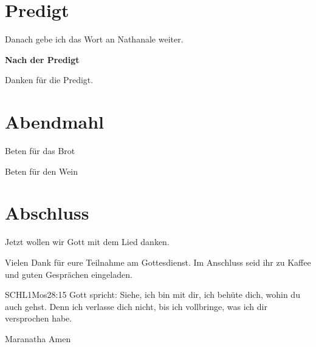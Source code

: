 \begin{spacing}{1.5}

\end{spacing}


\section{Predigt}

Danach gebe ich das Wort an Nathanale weiter.

\textbf{Nach der Predigt}

Danken für die Predigt.

\section{Abendmahl}

Beten für das Brot


Beten für den Wein


\section{Abschluss}

Jetzt wollen wir Gott mit dem Lied  danken.

Vielen Dank für eure Teilnahme am Gottesdienst. Im Anschluss seid ihr zu Kaffee und guten Gesprächen eingeladen.
\beten{}

\begin{bibelbox}{SCHL}{1Mos}{28:15}
Gott spricht: Siehe, ich bin mit dir,
ich behüte dich, wohin du auch gehst.
Denn ich verlasse dich nicht,
bis ich vollbringe, was ich dir versprochen habe.
\end{bibelbox}

Maranatha Amen

